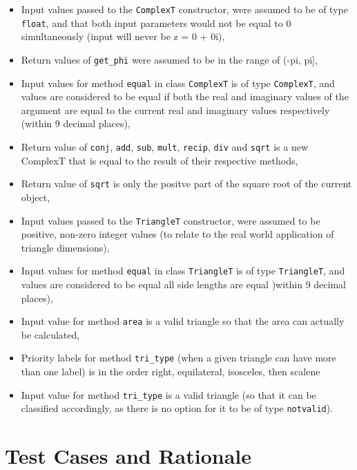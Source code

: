 \documentclass[12pt]{article}
\begin{document}
\begin{itemize}
        \item Input values passed to the \verb|ComplexT| constructor, were 
        assumed to be of type \verb|float|, and that both input parameters 
        would not be equal to 0 simultaneously (input will never be z = 0 + 0i),
        \item Return values of \verb|get_phi| were assumed to be in the range 
        of (-pi, pi],
        \item Input values for method \verb|equal| in class \verb|ComplexT| is 
        of type \verb|ComplexT|, and values are considered to be equal if both 
        the real and imaginary values of the argument are equal to the current 
        real and imaginary values respectively (within 9 decimal places),
        \item Return value of \verb|conj|, \verb|add|, \verb|sub|, \verb|mult|, 
        \verb|recip|, \verb|div| and \verb|sqrt| is a new ComplexT that is 
        equal to the result of their respective methods,
        \item Return value of \verb|sqrt| is only the positve part of the square 
        root of the current object, 
        \item Input values passed to the \verb|TriangleT| constructor, were 
        assumed to be positive, non-zero integer values (to relate to the real 
        world application of triangle dimensions),
        \item Input values for method \verb|equal| in class \verb|TriangleT| is 
        of type \verb|TriangleT|, and values are considered to be equal all side 
        lengths are equal )within 9 decimal places),
        \item Input value for method \verb|area| is a valid triangle so that the 
        area can actually be calculated, 
        \item Priority labels for method \verb|tri_type| (when a given triangle 
        can have more than one label) is in the order right, equilateral, 
        isosceles, then scalene
        \item Input value for method \verb|tri_type| is a valid triangle (so 
        that it can be classified accordingly, as there is no option for it 
        to be of type \verb|notvalid|).
\end{itemize}

\section{Test Cases and Rationale} \label{Testing}
\end{document}
